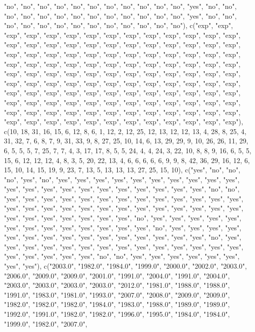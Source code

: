 \documentclass{article}\usepackage[]{graphicx}\usepackage[]{color}
\begin{document}
"no", "no", "no", "no", "no", "no", "no", "no", "no", "no", "no", "yes", "no", "no", "no", "no", "no", "no", "no", "no", "no", "no", "no", "no", "no", "yes", "no", "no", "no", "no", "no", "no", "no", "no", "no", "no", "no", "no", "no"), c("exp", "exp", "exp", "exp", "exp", "exp", "exp", "exp", "exp", "exp", "exp", "exp", "exp", "exp", "exp", "exp", "exp", "exp", "exp", "exp", "exp", "exp", "exp", "exp", "exp", "exp", "exp", "exp", "exp", "exp", "exp", "exp", "exp", "exp", "exp", "exp", "exp", "exp", "exp", "exp", "exp", "exp", "exp", "exp", "exp", "exp", "exp", "exp", "exp", "exp", "exp", "exp", "exp", "exp", "exp", "exp", "exp", "exp", "exp", "exp", "exp", "exp", "exp", "exp", "exp", "exp", "exp", "exp", "exp", "exp", "exp", "exp", 
"exp", "exp", "exp", "exp", "exp", "exp", "exp", "exp", "exp", "exp", "exp", "exp", "exp", "exp", "exp", "exp", "exp", "exp", "exp", "exp", "exp", "exp", "exp", "exp", "exp", "exp", "exp", "exp", "exp", "exp", "exp", "exp", "exp", "exp", "exp", "exp", "exp", "exp", "exp", "exp", "exp", "exp", "exp", "exp", "exp", "exp", "exp", "exp", "exp", "exp"), c(10, 18, 31, 16, 15, 6, 12, 8, 6, 1, 12, 2, 12, 25, 12, 13, 12, 12, 13, 4, 28, 8, 25, 4, 31, 32, 7, 6, 8, 7, 9, 31, 33, 9, 8, 27, 25, 10, 14, 6, 13, 29, 29, 9, 10, 26, 26, 11, 29, 6, 5, 5, 5, 7, 25, 7, 7, 4, 3, 17, 17, 8, 5, 5, 24, 4, 4, 24, 3, 22, 10, 8, 8, 9, 16, 6, 5, 5, 15, 6, 12, 12, 12, 4, 8, 3, 5, 20, 22, 13, 4, 6, 6, 6, 6, 6, 9, 9, 8, 42, 36, 29, 16, 12, 6, 15, 10, 14, 15, 19, 9, 23, 7, 13, 5, 13, 13, 13, 27, 25, 15, 10), c("yes", "no", "no", "no", "yes", "no", "yes", "yes", "yes", "yes", "yes", "yes", "yes", "yes", "yes", "yes", "yes", "yes", "yes", "yes", "yes", "yes", "yes", "yes", "yes", "yes", "yes", "no", "no", "yes", "yes", "yes", "yes", "yes", "yes", "yes", "yes", "yes", "yes", "yes", "yes", "yes", "yes", "yes", "yes", "yes", "yes", "yes", "yes", "yes", "yes", "yes", "yes", "yes", "yes", "yes", "yes", "yes", "yes", "yes", "yes", "yes", "no", "yes", "yes", "yes", "yes", "yes", "yes", "yes", "yes", "yes", "yes", 
"yes", "yes", "yes", "no", "yes", "yes", "yes", "yes", "yes", "yes", "yes", "yes", "yes", "yes", "yes", "yes", "yes", "yes", "yes", "no", "yes", "yes", "yes", "yes", "yes", "yes", "yes", "yes", "yes", "yes", "yes", "yes", "yes", "yes", "yes", "yes", "yes", "yes", "yes", "no", "no", "yes", "yes", "yes", "yes", "yes", "yes", "yes", "yes"), c("2003.0", "1982.0", "1984.0", "1999.0", "2000.0", "2002.0", "2003.0", "2006.0", "2009.0", "2009.0", "2001.0", "1991.0", "2004.0", "1991.0", "2004.0", "2003.0", "2003.0", "2003.0", "2003.0", "2012.0", "1981.0", "1988.0", "1988.0", "1991.0", "1983.0", "1981.0", "1993.0", "2007.0", "2008.0", "2009.0", "2009.0", "1982.0", "1982.0", "1982.0", "1984.0", "1983.0", "1988.0", "1989.0", "1989.0", "1992.0", "1991.0", "1982.0", "1982.0", "1996.0", "1995.0", "1984.0", "1984.0", "1999.0", "1982.0", "2007.0", 
\end{document}
